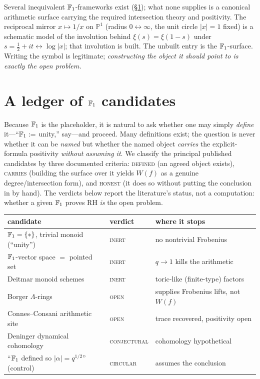 \documentclass[11pt]{article}
\begin{document}
\noindent Several inequivalent $\mathbb{F}_1$-frameworks exist (\S\ref{sec:ledger}); what none
supplies is a canonical arithmetic surface carrying the required intersection theory
and positivity. The reciprocal mirror $x\mapsto 1/x$ on $\mathbb{P}^1$ (radius $0
\leftrightarrow \infty$, the unit circle $|x|=1$ fixed) is a schematic model of the
involution behind $\xi(s)=\xi(1-s)$ under $s=\tfrac12+it \leftrightarrow \log|x|$; that
involution is built. The unbuilt entry is the $\mathbb{F}_1$-surface. Writing the symbol is
legitimate; \emph{constructing the object it should point to is exactly the open
problem.}

\section{A ledger of \texorpdfstring{$\mathbb{F}_1$}{F1} candidates}\label{sec:ledger}
Because $\mathbb{F}_1$ is the placeholder, it is natural to ask whether one may simply
\emph{define} it---``$\mathbb{F}_1 :=$ unity,'' say---and proceed. Many definitions exist; the
question is never whether it can be \emph{named} but whether the named object
\emph{carries} the explicit-formula positivity \emph{without assuming it}. We classify
the principal published candidates by three documented criteria: \textsc{defined} (an
agreed object exists), \textsc{carries} (building the surface over it yields $W(f)$ as a
genuine degree/intersection form), and \textsc{honest} (it does so without putting the
conclusion in by hand). The verdicts below report the literature's status, not a
computation: whether a given $\mathbb{F}_1$ proves RH \emph{is} the open problem.

\begin{center}\small
\begin{tabular}{lll}
\hline
candidate & verdict & where it stops \\
\hline
$\mathbb{F}_1=\{*\}$, trivial monoid (``unity'') & \textsc{inert} & no nontrivial Frobenius \\
$\mathbb{F}_1$-vector space $=$ pointed set \cite{Cohn} & \textsc{inert} & $q\to1$ kills the arithmetic \\
Deitmar monoid schemes \cite{Deitmar} & \textsc{inert} & toric-like (finite-type) factors \\
Borger $\Lambda$-rings \cite{Borger} & \textsc{open} & supplies Frobenius lifts, not $W(f)$ \\
Connes--Consani arithmetic site \cite{ConnesConsani} & \textsc{open} & trace recovered, positivity open \\
Deninger dynamical cohomology \cite{Deninger} & \textsc{conjectural} & cohomology hypothetical \\
``$\mathbb{F}_1$ defined so $|\alpha|=q^{1/2}$'' (control) & \textsc{circular} & assumes the conclusion \\
\hline
\end{tabular}
\end{center}
\end{document}
